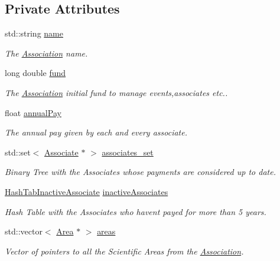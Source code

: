 \subsection*{Private Attributes}
\begin{DoxyCompactItemize}
\item 
std\+::string \mbox{\hyperlink{classAssociation_a165477d8d99c99a659d2f193b39ba1f8}{name}}
\begin{DoxyCompactList}\small\item\em The \mbox{\hyperlink{classAssociation}{Association}} name. \end{DoxyCompactList}\item 
long double \mbox{\hyperlink{classAssociation_a891f18ca3dbbbdfa2e8fab54b1683133}{fund}}
\begin{DoxyCompactList}\small\item\em The \mbox{\hyperlink{classAssociation}{Association}} initial fund to manage events,associates etc.. \end{DoxyCompactList}\item 
float \mbox{\hyperlink{classAssociation_a19f8a7aad1491bc14f558b0b852da0a4}{annual\+Pay}}
\begin{DoxyCompactList}\small\item\em The annual pay given by each and every associate. \end{DoxyCompactList}\item 
std\+::set$<$ \mbox{\hyperlink{classAssociate}{Associate}} $\ast$ $>$ \mbox{\hyperlink{classAssociation_a3dad047d1eed00d6bc0bb371b30e3bd0}{associates\+\_\+set}}
\begin{DoxyCompactList}\small\item\em Binary Tree with the Associates whose payments are considered up to date. \end{DoxyCompactList}\item 
\mbox{\hyperlink{Association_8h_a867982abd2e9432d5bed2574754bad3c}{Hash\+Tab\+Inactive\+Associate}} \mbox{\hyperlink{classAssociation_a13bdee38cb61374825f440c6015f1846}{inactive\+Associates}}
\begin{DoxyCompactList}\small\item\em Hash Table with the Associates who haven\textquotesingle{}t payed for more than 5 years. \end{DoxyCompactList}\item 
std\+::vector$<$ \mbox{\hyperlink{classArea}{Area}} $\ast$ $>$ \mbox{\hyperlink{classAssociation_a6e0125297a1927aae76d14710fc02862}{areas}}
\begin{DoxyCompactList}\small\item\em Vector of pointers to all the Scientific Areas from the \mbox{\hyperlink{classAssociation}{Association}}. \end{DoxyCompactList}\item 

\end{DoxyCompactItemize}
